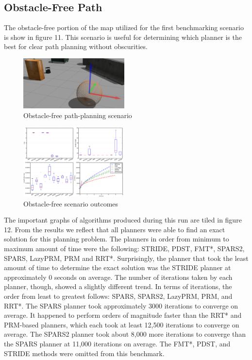 \documentclass[conference]{IEEEtran} \usepackage[T1]{fontenc} \usepackage[backend=biber, style=ieee]{biblatex}
\begin{document}
\subsection{Obstacle-Free Path} \label{Obstacle-free Path}

The obstacle-free portion of the map utilized for the first benchmarking scenario is show in figure 11. This scenario is useful for determining which planner is the
best for clear path planning without obscurities.

\begin{figure}
\label{figure11} 
\centering 
\includegraphics[width=0.49\textwidth]{scenario_1}
\caption{Obstacle-free path-planning scenario}
\end{figure}

\begin{figure}
\label{figure12} 
\centering 
\includegraphics[width=0.49\textwidth]{s1_outcomes}
\caption{Obstacle-free scenario outcomes}
\end{figure}

The important graphs of algorithms produced during this run are tiled in figure 12. From the results we reflect that all planners were able to find an exact solution
for this planning problem. The planners in order from minimum to maximum amount of time were the following: STRIDE, PDST, FMT*, SPARS2, SPARS, LazyPRM, PRM and RRT*. 
Surprisingly, the planner that took the least amount of time to determine the exact solution was the STRIDE planner at approximately 0 seconds on average. The number
of iterations taken by each planner, though, showed a slightly different trend. In terms of iterations, the order from least to greatest follows: SPARS, SPARS2, LazyPRM, PRM,
and RRT*. The SPARS planner took approximately 3000 iterations to converge on average. It happened to perform orders of magnitude faster than the RRT* and PRM-based planners, which 
each took at least 12,500 iterations to converge on average. The SPARS2 planner took about 8,000 more iterations to converge than the SPARS planner at 11,000 iterations on average.
The FMT*, PDST, and STRIDE methods were omitted from this benchmark.
\end{document}
